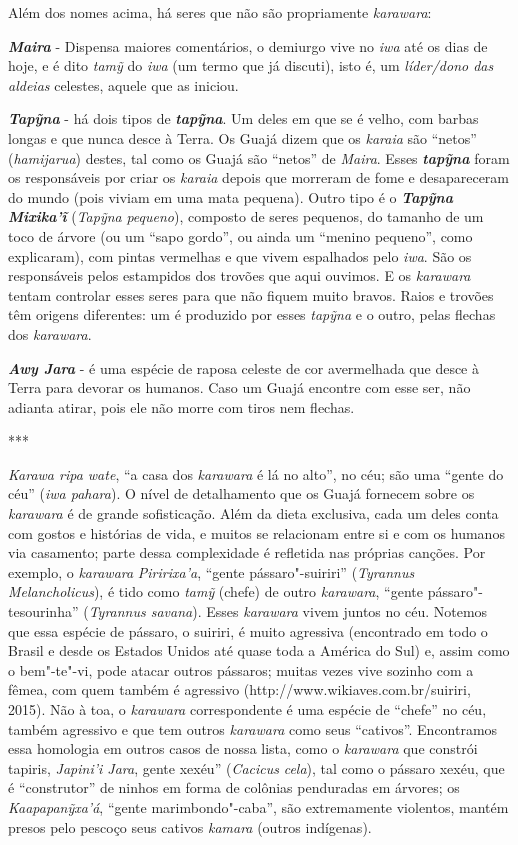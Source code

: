Além dos nomes acima, há seres que não são propriamente \emph{karawara}:

\emph{\textbf{Maira}} - Dispensa maiores comentários, o demiurgo vive no
\emph{iwa} até os dias de hoje, e é dito \emph{tamỹ} do \emph{iwa} (um
termo que já discuti), isto é, um \emph{líder/dono das aldeias}
celestes, aquele que as iniciou.

\emph{\textbf{Tapỹna}} - há dois tipos de \emph{\textbf{tapỹna}}. Um
deles em que se é velho, com barbas longas e que nunca desce à Terra. Os
Guajá dizem que os \emph{karaia} são ``netos'' (\emph{hamijarua}) destes,
tal como os Guajá são ``netos'' de \emph{Maira}. Esses
\emph{\textbf{tapỹna}} foram os responsáveis por criar os \emph{karaia}
depois que morreram de fome e desapareceram do mundo (pois viviam em uma
mata pequena). Outro tipo é o \textbf{\emph{Tapỹna Mixika'ĩ}}
(\emph{Tapỹna} \emph{pequeno}), composto de seres pequenos, do tamanho
de um toco de árvore (ou um ``sapo gordo'', ou ainda um ``menino pequeno'',
como explicaram), com pintas vermelhas e que vivem espalhados pelo
\emph{iwa}. São os responsáveis pelos estampidos dos trovões que aqui
ouvimos. E os \emph{karawara} tentam controlar esses seres para que não
fiquem muito bravos. Raios e trovões têm origens diferentes: um é
produzido por esses \emph{tapỹna} e o outro, pelas flechas dos
\emph{karawara}.

\emph{\textbf{Awy Jara}} - é uma espécie de raposa celeste de cor
avermelhada que desce à Terra para devorar os humanos. Caso um Guajá
encontre com esse ser, não adianta atirar, pois ele não morre com tiros
nem flechas.

***

\emph{Karawa ripa wate}, ``a casa dos \emph{karawara} é lá no alto'', no
céu; são uma ``gente do céu'' (\emph{iwa pahara}). O nível de
detalhamento que os Guajá fornecem sobre os \emph{karawara} é de grande
sofisticação. Além da dieta exclusiva, cada um deles conta com gostos e
histórias de vida, e muitos se relacionam entre si e com os humanos via
casamento; parte dessa complexidade é refletida nas próprias canções.
Por exemplo, o \emph{karawara} \emph{Piririxa'a}, ``gente
pássaro"-suiriri'' (\emph{Tyrannus Melancholicus}), é tido como
\emph{tamỹ} (chefe) de outro \emph{karawara}, ``gente
pássaro"-tesourinha'' (\emph{Tyrannus savana}). Esses \emph{karawara}
vivem juntos no céu. Notemos que essa espécie de pássaro, o suiriri, é
muito agressiva (encontrado em todo o Brasil e desde os Estados Unidos
até quase toda a América do Sul) e, assim como o bem"-te"-vi, pode atacar
outros pássaros; muitas vezes vive sozinho com a fêmea, com quem também
é agressivo (http://www.wikiaves.com.br/suiriri, 2015). Não à toa, o
\emph{karawara} correspondente é uma espécie de ``chefe'' no céu, também
agressivo e que tem outros \emph{karawara} como seus ``cativos''.
Encontramos essa homologia em outros casos de nossa lista, como o
\emph{karawara} que constrói tapiris, \emph{Japini'i Jara}, gente
xexéu'' (\emph{Cacicus} \emph{cela}), tal como o pássaro xexéu, que é
``construtor'' de ninhos em forma de colônias penduradas em árvores; os
\emph{Kaapapanỹxa'á}, ``gente marimbondo"-caba'', são extremamente
violentos, mantém presos pelo pescoço seus cativos \emph{kamara} (outros
indígenas).

